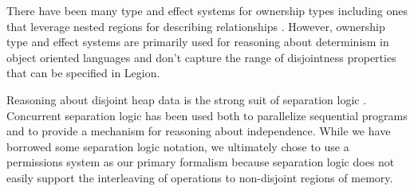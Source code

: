 There have been many type and effect systems for ownership types
\cite{Boyapati03} including ones that leverage nested regions for describing
relationships \cite{Clarke02,Cameron07}.  However, ownership type and effect systems
are primarily used for reasoning about determinism in object oriented languages and
don't capture the range of disjointness properties that can be specified in Legion.

Reasoning about disjoint heap data is the strong suit of separation logic \cite{Reynolds02}.  
Concurrent separation logic\cite{Brookes04} has been 
used both to parallelize sequential programs\cite{Raza09,Gotsman07} and to provide 
a mechanism for reasoning about independence\cite{Hayman06}.
While we have borrowed some separation logic notation, we ultimately chose to use a 
permissions system as our primary formalism because separation logic does not easily
support the interleaving of operations to non-disjoint regions of memory.





